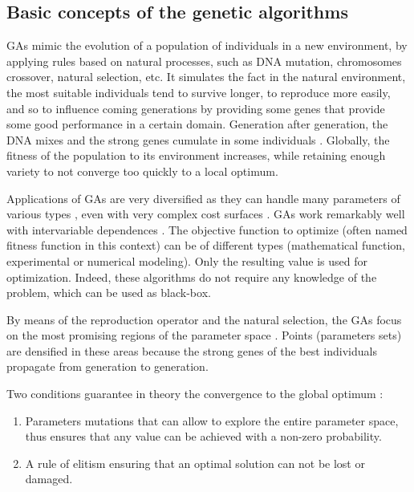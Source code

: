 \documentclass[twocol]{ametsoc}
\begin{document}
\subsection{Basic concepts of the genetic algorithms}

GAs mimic the evolution of a population of individuals in a new environment, by applying rules based on natural processes, such as DNA mutation, chromosomes crossover, natural selection, etc. It simulates the fact in the natural environment, the most suitable individuals tend to survive longer, to reproduce more easily, and so to influence coming generations by providing some genes that provide some good performance in a certain domain. Generation after generation, the DNA mixes and the strong genes cumulate in some individuals \citep{Beasley1996a}. Globally, the fitness of the population to its environment increases, while retaining enough variety to not converge too quickly to a local optimum.

Applications of GAs are very diversified as they can handle many parameters of various types \citep{Joines1996a}, even with very complex cost surfaces \citep{Haupt2004}. GAs work remarkably well with intervariable dependences \citep{Haupt2004}. The objective function to optimize (often named fitness function in this context) can be of different types (mathematical function, experimental or numerical modeling). Only the resulting value is used for optimization. Indeed, these algorithms do not require any knowledge of the problem, which can be used as black-box.

By means of the reproduction operator and the natural selection, the GAs focus on the most promising regions of the parameter space \citep{Holland1992b}. Points (parameters sets) are densified in these areas because the strong genes of the best individuals propagate from generation to generation.

Two conditions guarantee in theory the convergence to the global optimum \citep{Zitzler2004a}:

\begin{enumerate}
	\item Parameters mutations that can allow to explore the entire parameter space, thus ensures that any value can be achieved with a non-zero probability.
	\item A rule of elitism ensuring that an optimal solution can not be lost or damaged.
\end{enumerate}
\end{document}
